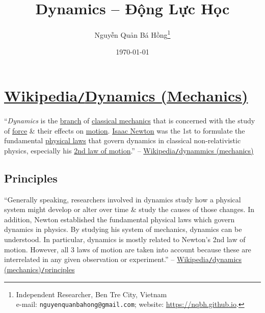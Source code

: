 \documentclass{article}
\title{Dynamics -- Động Lực Học}
\author{Nguyễn Quản Bá Hồng\footnote{Independent Researcher, Ben Tre City, Vietnam\\e-mail: \texttt{nguyenquanbahong@gmail.com}; website: \url{https://nqbh.github.io}.}}
\date{\today}
\numberwithin{equation}{section}
\begin{document}
\maketitle
\begin{abstract}
	
\end{abstract}
\setcounter{secnumdepth}{4}
\setcounter{tocdepth}{3}
\tableofcontents
\newpage


\section{\href{https://en.wikipedia.org/wiki/Dynamics_(mechanics)}{Wikipedia\texttt{/}Dynamics (Mechanics)}}
``\textit{Dynamics} is the \href{https://en.wikipedia.org/wiki/Branch_(academia)#Physics}{branch} of \href{https://en.wikipedia.org/wiki/Classical_mechanics}{classical mechanics} that is concerned with the study of \href{https://en.wikipedia.org/wiki/Force_(physics)}{force} \& their effects on \href{https://en.wikipedia.org/wiki/Motion_(physics)}{motion}. \href{https://en.wikipedia.org/wiki/Isaac_Newton}{Isaac Newton} was the 1st to formulate the fundamental \href{https://en.wikipedia.org/wiki/Physical_law}{physical laws} that govern dynamics in classical non-relativistic physics, especially his \href{https://en.wikipedia.org/wiki/Second_law_of_motion}{2nd law of motion}.'' -- \href{https://en.wikipedia.org/wiki/Dynamics_(mechanics)}{Wikipedia\texttt{/}dynammics (mechanics)}

\subsection{Principles}
``Generally speaking, researchers involved in dynamics study how a physical system might develop or alter over time \& study the causes of those changes. In addition, Newton established the fundamental physical laws which govern dynamics in physics. By studying his system of mechanics, dynamics can be understood. In particular, dynamics is mostly related to Newton's 2nd law of motion. However, all 3 laws of motion are taken into account because these are interrelated in any given observation or experiment.'' -- \href{https://en.wikipedia.org/wiki/Dynamics_(mechanics)#Principles}{Wikipedia\texttt{/}dynamics (mechanics)\texttt{/}principles}
\end{document}
